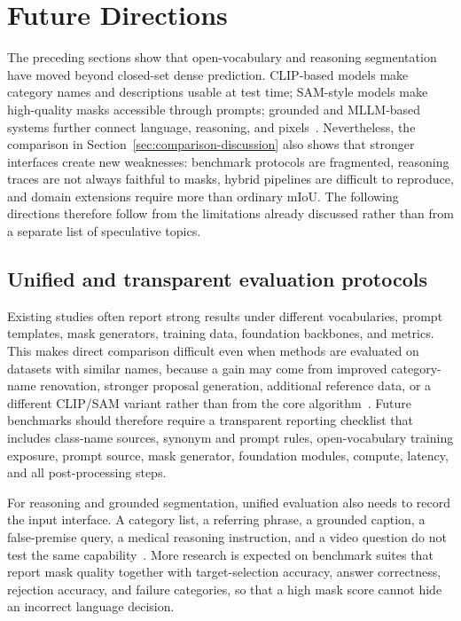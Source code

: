 \section{Future Directions}
\label{sec:future-directions}

The preceding sections show that open-vocabulary and reasoning segmentation have moved beyond closed-set dense prediction. CLIP-based models make category names and descriptions usable at test time; SAM-style models make high-quality masks accessible through prompts; grounded and MLLM-based systems further connect language, reasoning, and pixels~\citep{radford2021learning,kirillov2023sam,ravi2024sam2,xlaiLisaReasoningSegmentation2024,renPixellmPixelReasoning2024}. Nevertheless, the comparison in Section~\ref{sec:comparison-discussion} also shows that stronger interfaces create new weaknesses: benchmark protocols are fragmented, reasoning traces are not always faithful to masks, hybrid pipelines are difficult to reproduce, and domain extensions require more than ordinary mIoU. The following directions therefore follow from the limitations already discussed rather than from a separate list of speculative topics.

\subsection{Unified and transparent evaluation protocols}

Existing studies often report strong results under different vocabularies, prompt templates, mask generators, training data, foundation backbones, and metrics. This makes direct comparison difficult even when methods are evaluated on datasets with similar names, because a gain may come from improved category-name renovation, stronger proposal generation, additional reference data, or a different CLIP/SAM variant rather than from the core algorithm~\citep{liang2023ovseg,xu2023san,hhuangRenovatingNamesOpenvocabulary2024,ybenigmimFlossFreeLunch2025,shiyHarnessingVisionFoundation2025}. Future benchmarks should therefore require a transparent reporting checklist that includes class-name sources, synonym and prompt rules, open-vocabulary training exposure, prompt source, mask generator, foundation modules, compute, latency, and all post-processing steps.

For reasoning and grounded segmentation, unified evaluation also needs to record the input interface. A category list, a referring phrase, a grounded caption, a false-premise query, a medical reasoning instruction, and a video question do not test the same capability~\citep{chngMaskGroundingReferring2024,rasheedGlammPixelGrounding2024,huGroundingSuiteMeasuringComplex2025,yanMedreasonerReinforcementLearning2026,zhengVillaVideoReasoning2025}. More research is expected on benchmark suites that report mask quality together with target-selection accuracy, answer correctness, rejection accuracy, and failure categories, so that a high mask score cannot hide an incorrect language decision.

